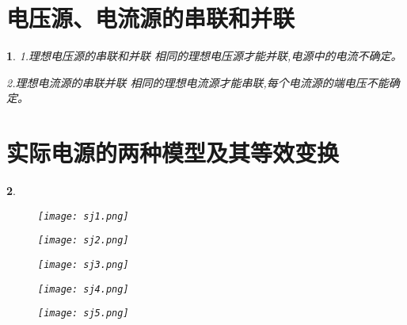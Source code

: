 \documentclass[UTF8]{report}
\theoremstyle{MyLineTheoremStyle} %
\theoremstyle{MyBlockTheoremStyle} %
\theoremstyle{MySubsubsectionStyle} %
\newtheorem{definition}{}
\begin{document}
\section{电压源、电流源的串联和并联}

\begin{definition}
    1.理想电压源的串联和并联
    相同的理想电压源才能并联,电源中的电流不确定。

    2.理想电流源的串联并联
    相同的理想电流源才能串联,每个电流源的端电压不能确定。
\end{definition}

\section{实际电源的两种模型及其等效变换}

\cleardoublepage

\begin{definition}
    \begin{figure}
        \centering
        \texttt{[image: sj1.png]}
    \end{figure}

    \vspace{1mm} %

    \begin{figure}[H]
        \centering
        \texttt{[image: sj2.png]}
    \end{figure}

    \vspace{1mm} %

    \begin{figure}[H]
        \centering
        \texttt{[image: sj3.png]}
    \end{figure}

    \vspace{1mm} %

    \begin{figure}[H]
        \centering
        \texttt{[image: sj4.png]}
    \end{figure}

    \vspace{1mm} %

    \begin{figure}[H]
        \centering
        \texttt{[image: sj5.png]}
    \end{figure}
\end{definition}
\end{document}
